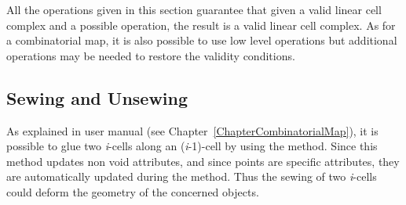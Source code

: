 
All the operations given in this section guarantee that given a valid
linear cell complex and a possible operation, the result is a valid
linear cell complex. As for a combinatorial map, it is also possible
to use low level operations but additional operations may be needed to
restore the validity conditions.


\subsection{Sewing and Unsewing \label{ssec-lcc-link-darts}}

As explained in  user manual (see
Chapter~\ref{ChapterCombinatorialMap}), it is possible to glue two
\emph{i}-cells along an (\emph{i}-1)-cell by using the 
method. Since this method updates non void attributes, and since
points are specific attributes, they are automatically updated during
the  method. Thus the sewing of two \emph{i}-cells could
deform the geometry of the concerned objects.

